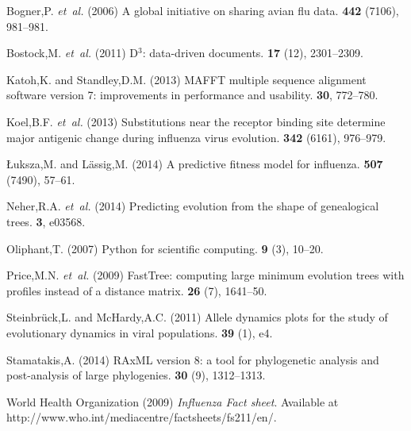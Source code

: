 \documentclass{bioinfo}
\begin{document}
\begin{thebibliography}{}

Bogner,P. {\em et~al.} (2006{\em{}}) A global
  initiative on sharing avian flu data.
 {\bf 442} (7106), 981--981.

Bostock,M. {\em et~al.} (2011{\em{}}) D$^3$: data-driven
  documents.
 {\bf 17} (12), 2301--2309.

Katoh,K. and Standley,D.M. (2013{\em{}}) {MAFFT} multiple sequence alignment
  software version 7: improvements in performance and usability.
 {\bf 30}, 772--780.

Koel,B.F. {\em et~al.} (2013{\em{}})
  Substitutions near the receptor binding site determine major antigenic change
  during influenza virus evolution.
 {\bf 342} (6161), 976--979.

\L{}uksza,M. and L\"a{}ssig,M. (2014{\em{}}) A predictive fitness model for
  influenza.
 {\bf 507} (7490), 57--61.

Neher,R.A. {\em et~al.} (2014{\em{}}) Predicting evolution
  from the shape of genealogical trees.
 {\bf 3}, e03568.

Oliphant,T. (2007{\em{}}) Python for scientific computing.
 {\bf 9} (3), 10--20.

Price,M.N. {\em et~al.} (2009{\em{}}) {FastTree:} computing
  large minimum evolution trees with profiles instead of a distance matrix.
 {\bf 26} (7), 1641--50.

Steinbr\"{u}ck,L. and McHardy,A.C. (2011{\em{}}) Allele dynamics plots for the study of evolutionary dynamics in viral populations.
 {\bf 39} (1), e4.

Stamatakis,A. (2014{\em{}}) {RAxML} version 8: a tool for phylogenetic analysis
  and post-analysis of large phylogenies.
 {\bf 30} (9), 1312--1313.

{World Health Organization} (2009{\em{}}) {\em {Influenza Fact sheet}}.
\newblock Available at http://www.who.int/mediacentre/factsheets/fs211/en/.

\end{thebibliography}
\end{document}

